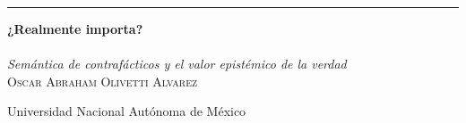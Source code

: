 
\begin{titlingpage} %

	\raggedleft %

	\rule{1pt}{\textheight} %
	\hspace{0.04\textwidth} %
	\parbox[b]{0.85\textwidth}{ %

	{\Huge\bfseries ¿Realmente importa? \\[0.3\baselineskip]}\\[1\baselineskip] %
	\large{\emph{Semántica de contrafácticos y el valor epistémico de la verdad}}\\[4\baselineskip] %
	{\Large\textsc{Oscar Abraham Olivetti Alvarez}} %


	\vspace{0.5\textheight} %

	{\noindent Universidad Nacional Autónoma de
México}}       %

\end{titlingpage}

